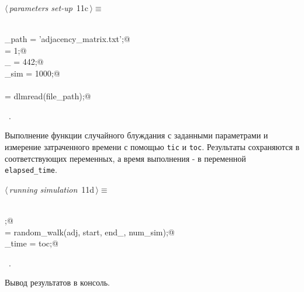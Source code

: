 \documentclass{article}
\begin{document}
\begin{flushleft} \small
\begin{minipage}{\linewidth}\label{scrap15}\raggedright\small
{} $\langle\,${\itshape parameters set-up}\nobreak\ {\footnotesize {11c}}$\,\rangle\equiv$
\vspace{-1ex}
\begin{list}{}{} \item
\mbox{}\verb@@\\
\mbox{}\verb@file_path = 'adjacency_matrix.txt';@\\
\mbox{}\verb@start = 1;@\\
\mbox{}\verb@end_ = 442;@\\
\mbox{}\verb@num_sim = 1000;@\\
\mbox{}\verb@@\\
\mbox{}\verb@adj = dlmread(file_path);@\\
\mbox{}\verb@@{\NWsep}
\end{list}
\vspace{-1.5ex}
\footnotesize
\begin{list}{}{\setlength{\itemsep}{-\parsep}\setlength{\itemindent}{-\leftmargin}}
\item \NWtxtMacroRefIn\ .

\item{}
\end{list}
\end{minipage}\vspace{4ex}
\end{flushleft}
Выполнение функции случайного блуждания с заданными параметрами и измерение затраченного времени с помощью \texttt{tic} и \texttt{toc}. Результаты сохраняются в соответствующих переменных, а время выполнения - в переменной \texttt{elapsed_time}.

\begin{flushleft} \small
\begin{minipage}{\linewidth}\label{scrap16}\raggedright\small
{} $\langle\,${\itshape running simulation}\nobreak\ {\footnotesize {11d}}$\,\rangle\equiv$
\vspace{-1ex}
\begin{list}{}{} \item
\mbox{}\verb@@\\
\mbox{}\verb@tic;@\\
\mbox{} = random_walk(adj, start, end_, num_sim);@\\
\mbox{}\verb@elapsed_time = toc;@\\
\mbox{}\verb@@{\NWsep}
\end{list}
\vspace{-1.5ex}
\footnotesize
\begin{list}{}{\setlength{\itemsep}{-\parsep}\setlength{\itemindent}{-\leftmargin}}
\item \NWtxtMacroRefIn\ .

\item{}
\end{list}
\end{minipage}\vspace{4ex}
\end{flushleft}
Вывод результатов в консоль.
\end{document}
